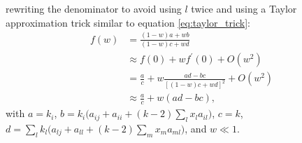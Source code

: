 \documentclass[14pt, a4paper, justified]{article}
\begin{document}
rewriting the denominator to avoid using $l$ twice and using a Taylor approximation trick similar to equation \ref{eq:taylor_trick}:
\begin{equation}
    \begin{split}
        f(w) & = \frac{(1 - w)a + wb}{(1 - w)c + wd}
        \\
        & \approx f(0) + w f^\prime(0) + O(w^2)
        \\
        & = \frac{a}{c} + w \frac{ad - bc}{[(1-w)c + wd]^2} + O(w^2)
        \\
        & \approx \frac{a}{c} + w(ad - bc),
    \end{split}
\end{equation}
with $a = k_i$, $b = k_i \Big( a_{ij} + a_{ii} + (k-2) \sum_l x_l a_{il} \Big) $, $c = k$, $d = \sum_l k_l \Big( a_{lj} + a_{ll} + (k-2) \sum_m x_m a_{ml} \Big)$, and $w \ll 1$.
\end{document}
